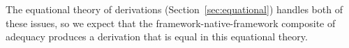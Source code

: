 The equational theory of derivations (Section~\ref{sec:equational})
handles both of these issues, so we expect that the
framework-native-framework composite of adequacy produces a derivation
that is equal in this equational theory.


